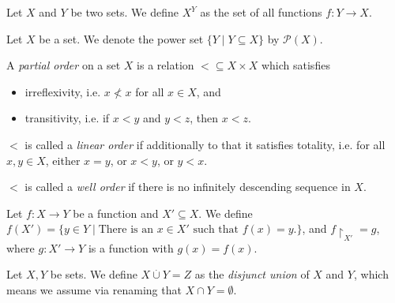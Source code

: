 \begin{defn}
	Let $X$ and $Y$ be two sets. We define $X^Y$ as the set of all functions $f : Y \rightarrow X$.
\end{defn}

\begin{defn}
	Let $X$ be a set. We denote the power set $\{ Y \mid Y \subseteq X \}$ by $\mathcal{P}(X)$.
\end{defn}

\begin{defn}
	A \emph{partial order} on a set $X$ is a relation $< \subseteq X \times X$ which satisfies
	\begin{itemize}
		\item irreflexivity, i.e. $x \not< x$ for all $x \in X$, and
		\item transitivity, i.e. if $x < y$ and $y < z$, then $x < z$.
	\end{itemize}
	
	$<$ is called a \emph{linear order} if additionally to that it satisfies totality, i.e. for all $x, y \in X$, either $x = y$, or $x < y$, or $y < x$.
	
	$<$ is called a \emph{well order} if there is no infinitely descending sequence in $X$.
\end{defn}


\begin{defn}
	Let $f : X \rightarrow Y$ be a function and $X' \subseteq X$. We define $f(X') = \{y \in Y \mid \text{There is an } x \in X' \text{ such that } f(x) = y \text{.}\}$, and $f \upharpoonright_{X'} = g$, where $g : X' \rightarrow Y$ is a function with $g(x) = f(x)$.
\end{defn}


\begin{defn}
	Let $X, Y$ be sets. We define $X \overset{.}\cup Y = Z$ as the \emph{disjunct union} of $X$ and $Y$, which means we assume via renaming that $X \cap Y = \emptyset$.
\end{defn}



